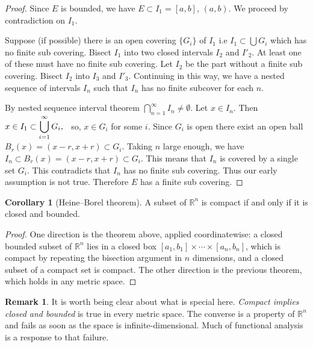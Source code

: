 \documentclass[11pt,a4paper]{article}
\theoremstyle{definition}
\newtheorem{coro}[thm]{Corollary}
\newtheorem*{remark}{Remark}
\begin{document}
\begin{proof}
Since $E$ is bounded, we have $E\subset I_1=[a,b]$, $(a,b)$. We proceed by
contradiction on $I_1$.

Suppose (if possible) there is an open covering $\{G_i\}$ of $I_1$ i.e
$I_1\subset \bigcup G_i$ which has no finite sub covering. Bisect $I_1$ into two
closed intervals $I_2$ and $I'_2$. At least one of these must have no finite sub
covering. Let $I_2$ be the part without a finite sub covering. Bisect $I_2$ into
$I_3$ and $I'_3$. Continuing in this way, we have a nested sequence of intervals
$I_n$ such that $I_n$ has no finite subcover for each $n$.

By nested sequence interval theorem
\hspace{0.2cm}$\displaystyle{\bigcap_{n=1}^{\infty}I_n\neq \emptyset}.$
Let $x\in I_n$. Then
\hspace{0.2cm}$\displaystyle{ x\in I_1\subset \bigcup^{\infty}_{i=1}G_i},\hspace{0.2cm}$
so, $x\in G_i$ for some $i$. Since $G_i$ is open there exist an open ball
\hspace{0.2cm}$B_r(x)=(x-r,x+r)\subset G_i.$ Taking $n$ large enough, we have
\hspace{0.2cm}$I_n\subset B_r(x)=(x-r,x+r)\subset G_i.$ This means that $I_n$ is
covered by a single set $G_i$. This contradicts that $I_n$ has no finite sub
covering. Thus our early assumption is not true. Therefore $E$ has a finite sub
covering.
\end{proof}

\begin{coro}[Heine--Borel theorem]
A subset of $\mathbb{R}^n$ is compact if and only if it is closed and bounded.
\end{coro}

\begin{proof}
One direction is the theorem above, applied coordinatewise: a closed bounded
subset of $\mathbb{R}^n$ lies in a closed box $[a_1,b_1]\times\cdots\times[a_n,b_n]$,
which is compact by repeating the bisection argument in $n$ dimensions, and a
closed subset of a compact set is compact. The other direction is the previous
theorem, which holds in any metric space.
\end{proof}

\begin{remark}
It is worth being clear about what is special here. \emph{Compact implies closed
and bounded} is true in every metric space. The converse is a property of
$\mathbb{R}^n$ and fails as soon as the space is infinite-dimensional. Much of
functional analysis is a response to that failure.
\end{remark}
\end{document}
